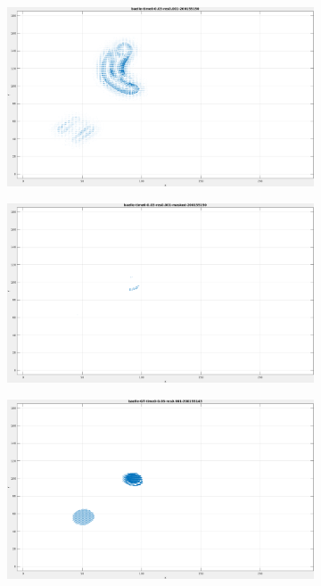 \begin{figure}[tb]
\centering
\begin{subfigure}{.45\textwidth}
  \centering
  \includegraphics[height=.6\linewidth]{figs/baelle/baelle-1.png}
  \caption{}
\label{fig:baelle-snapshots1}
\end{subfigure}
\begin{subfigure}{.45\textwidth}
  \includegraphics[height=.6\linewidth]{figs/baelle/baelle-masked-1.png}
  \caption{}
\end{subfigure}
\begin{subfigure}{.45\textwidth}
  \centering
  \includegraphics[height=.6\linewidth]{figs/baelle/baelle-GT-1.png}

\end{subfigure}
\end{figure}
